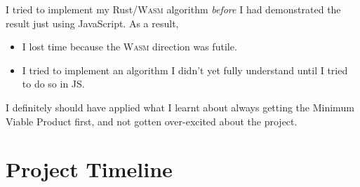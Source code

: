 \documentclass[a4paper,10pt,twocolumn]{article}
\theoremstyle{definition}
\newcommand*{\acronym}{\textsc}
\newcommand*{\WASM}{\acronym{Wasm}}
\begin{document}
I tried to implement my Rust/\WASM{} algorithm \emph{before} I had demonstrated
the result just using JavaScript.
As a result,
\begin{itemize}
\item I lost time because the \WASM{} direction was futile.
\item I tried to implement an algorithm I didn't yet fully understand until I
  tried to do so in JS.
\end{itemize}
I definitely should have applied what I learnt about always getting the Minimum
Viable Product first, and not gotten over-excited about the project.


\appendix
\section{Project Timeline}
\end{document}
